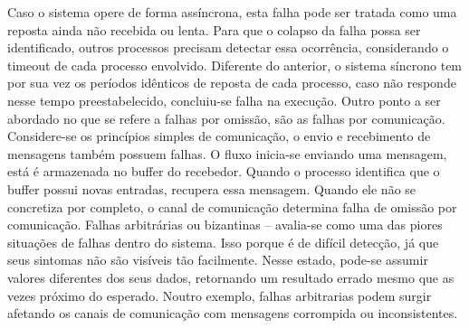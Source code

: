Caso o sistema opere de forma assíncrona, esta falha pode ser tratada como uma reposta ainda não recebida ou lenta. Para que o colapso da falha possa ser identificado, outros processos precisam detectar essa ocorrência, considerando o timeout de cada processo envolvido. Diferente do anterior, o sistema síncrono tem por sua vez os períodos idênticos de reposta de cada processo, caso não responde nesse tempo preestabelecido, concluiu-se falha na execução.
Outro ponto a ser abordado no que se refere a falhas por omissão, são as falhas por comunicação. Considere-se os princípios simples de comunicação, o envio e recebimento de mensagens também possuem falhas. O fluxo inicia-se enviando uma mensagem, está é armazenada no buffer do recebedor. Quando o processo identifica que o buffer possui novas entradas, recupera essa mensagem. Quando ele não se concretiza por completo, o canal de comunicação determina falha de omissão por comunicação.
Falhas arbitrárias ou bizantinas – avalia-se como uma das piores situações de falhas dentro do sistema. Isso porque é de difícil detecção, já que seus sintomas não são visíveis tão facilmente. Nesse estado, pode-se assumir valores diferentes dos seus dados, retornando um resultado errado mesmo que as vezes próximo do esperado. Noutro exemplo, falhas arbitrarias podem surgir afetando os canais de comunicação com mensagens corrompida ou inconsistentes.
